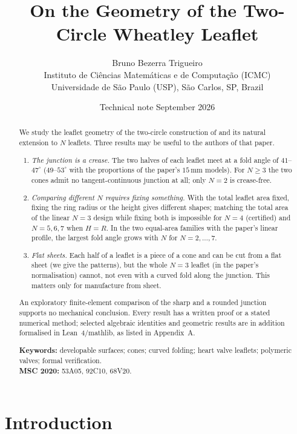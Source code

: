 \documentclass[11pt,a4paper]{article}
\title{\bfseries On the Geometry of the Two-Circle Wheatley Leaflet}
\author{Bruno Bezerra Trigueiro\\[2pt]
  \small Instituto de Ci\^encias Matem\'aticas e de Computa\c{c}\~ao (ICMC)\\
  \small Universidade de S\~ao Paulo (USP), S\~ao Carlos, SP, Brazil}
\date{Technical note \quad September 2026}
\theoremstyle{plain}
\theoremstyle{remark}
\begin{document}
\maketitle
\thispagestyle{fancy}

\begin{abstract}
\noindent We study the leaflet geometry of the two-circle construction of \citet{McKee2026} and its natural extension to
$N$ leaflets. Three results may be useful to the authors of that paper.
\begin{enumerate}[label=(\roman*),leftmargin=2em]
\item \emph{The junction is a crease.} The two halves of each leaflet meet at a fold angle of $41$--$47^\circ$
  ($49$--$53^\circ$ with the proportions of the paper's $15$\,mm models). For $N\ge3$ the two cones admit no
  tangent-continuous junction at all; only $N=2$ is crease-free.
\item \emph{Comparing different $N$ requires fixing something.} With the total leaflet area fixed, fixing the ring radius or
  the height gives different shapes; matching the total area of the linear $N=3$ design while fixing both is impossible
  for $N=4$ (certified) and $N=5,6,7$ when $H=R$. In the two equal-area families with the paper's linear profile, the
  largest fold angle grows with $N$ for $N=2,\dots,7$.
\item \emph{Flat sheets.} Each half of a leaflet is a piece of a cone and can be cut from a flat sheet (we give the
  patterns), but the whole $N=3$ leaflet (in the paper's normalisation) cannot, not even with a curved fold along the
  junction. This matters only for manufacture from sheet.
\end{enumerate}
An exploratory finite-element comparison of the sharp and a rounded junction supports no mechanical conclusion.
Every result has a written proof or a stated numerical method; selected algebraic identities and geometric results are
in addition formalised in Lean~4/mathlib, as listed in Appendix~A.

\medskip\noindent\textbf{Keywords:} developable surfaces; cones; curved folding; heart valve leaflets; polymeric valves;
formal verification.\\
\textbf{MSC 2020:} 53A05, 92C10, 68V20.
\end{abstract}

\tableofcontents

\section{Introduction}\label{sec:intro}
\end{document}
